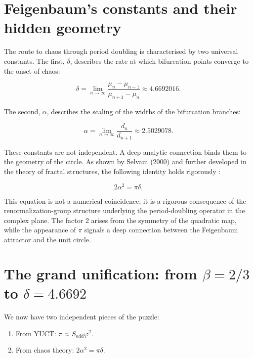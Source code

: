 \documentclass[11pt,a4paper]{article}
\begin{document}
	\section{Feigenbaum's constants and their hidden geometry}
	
	The route to chaos through period doubling is characterised by two universal constants. The first, \(\delta\), describes the rate at which bifurcation points converge to the onset of chaos:
	
	\begin{equation}
		\delta = \lim_{n\to\infty} \frac{\mu_n - \mu_{n-1}}{\mu_{n+1} - \mu_n} \approx 4.6692016.
	\end{equation}
	
	The second, \(\alpha\), describes the scaling of the widths of the bifurcation branches:
	
	\begin{equation}
		\alpha = \lim_{n\to\infty} \frac{d_n}{d_{n+1}} \approx 2.5029078.
	\end{equation}
	
	These constants are not independent. A deep analytic connection binds them to the geometry of the circle. As shown by Selvam (2000) and further developed in the theory of fractal structures, the following identity holds rigorously \cite{Selvam2000}:
	
	\begin{equation}
		2\alpha^2 = \pi \delta.
		\label{eq:feigenbaum-pi}
	\end{equation}
	
	This equation is not a numerical coincidence; it is a rigorous consequence of the renormalization-group structure underlying the period-doubling operator in the complex plane. The factor 2 arises from the symmetry of the quadratic map, while the appearance of \(\pi\) signals a deep connection between the Feigenbaum attractor and the unit circle.
	
	\section{The grand unification: from \(\beta = 2/3\) to \(\delta = 4.6692\)}
	
	We now have two independent pieces of the puzzle:
	\begin{enumerate}
		\item From YUCT: \(\pi \approx S_{\mathrm{odd}}\varphi^2\).
		\item From chaos theory: \(2\alpha^2 = \pi \delta\).
	\end{enumerate}
	
\end{document}
